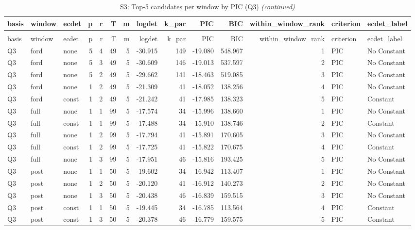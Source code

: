\begingroup\fontsize{9}{11}\selectfont

\begin{longtable}[t]{lllrrrrrrrrrll}
\caption{\label{tab:tab:S3_pic_top5_Q3}S3: Top-5 candidates per window by PIC (Q3)}\\
\toprule
basis & window & ecdet & p & r & T & m & logdet & k\_par & PIC & BIC & within\_window\_rank & criterion & ecdet\_label\\
\midrule
\endfirsthead
\caption[]{S3: Top-5 candidates per window by PIC (Q3) \textit{(continued)}}\\
\toprule
basis & window & ecdet & p & r & T & m & logdet & k\_par & PIC & BIC & within\_window\_rank & criterion & ecdet\_label\\
\midrule
\endhead

\endfoot
\bottomrule
\endlastfoot
Q3 & ford & none & 5 & 4 & 49 & 5 & -30.915 & 149 & -19.080 & 548.967 & 1 & PIC & No Constant\\
Q3 & ford & none & 5 & 3 & 49 & 5 & -30.609 & 146 & -19.013 & 537.597 & 2 & PIC & No Constant\\
Q3 & ford & none & 5 & 2 & 49 & 5 & -29.662 & 141 & -18.463 & 519.085 & 3 & PIC & No Constant\\
Q3 & ford & none & 1 & 2 & 49 & 5 & -21.309 & 41 & -18.052 & 138.256 & 4 & PIC & No Constant\\
Q3 & ford & const & 1 & 2 & 49 & 5 & -21.242 & 41 & -17.985 & 138.323 & 5 & PIC & Constant\\
\addlinespace
Q3 & full & none & 1 & 1 & 99 & 5 & -17.574 & 34 & -15.996 & 138.660 & 1 & PIC & No Constant\\
Q3 & full & const & 1 & 1 & 99 & 5 & -17.488 & 34 & -15.910 & 138.746 & 2 & PIC & Constant\\
Q3 & full & none & 1 & 2 & 99 & 5 & -17.794 & 41 & -15.891 & 170.605 & 3 & PIC & No Constant\\
Q3 & full & const & 1 & 2 & 99 & 5 & -17.725 & 41 & -15.822 & 170.675 & 4 & PIC & Constant\\
Q3 & full & none & 1 & 3 & 99 & 5 & -17.951 & 46 & -15.816 & 193.425 & 5 & PIC & No Constant\\
\addlinespace
Q3 & post & none & 1 & 1 & 50 & 5 & -19.602 & 34 & -16.942 & 113.407 & 1 & PIC & No Constant\\
Q3 & post & none & 1 & 2 & 50 & 5 & -20.120 & 41 & -16.912 & 140.273 & 2 & PIC & No Constant\\
Q3 & post & none & 1 & 3 & 50 & 5 & -20.438 & 46 & -16.839 & 159.515 & 3 & PIC & No Constant\\
Q3 & post & const & 1 & 1 & 50 & 5 & -19.445 & 34 & -16.785 & 113.564 & 4 & PIC & Constant\\
Q3 & post & const & 1 & 3 & 50 & 5 & -20.378 & 46 & -16.779 & 159.575 & 5 & PIC & Constant\\*
\end{longtable}
\endgroup{}
